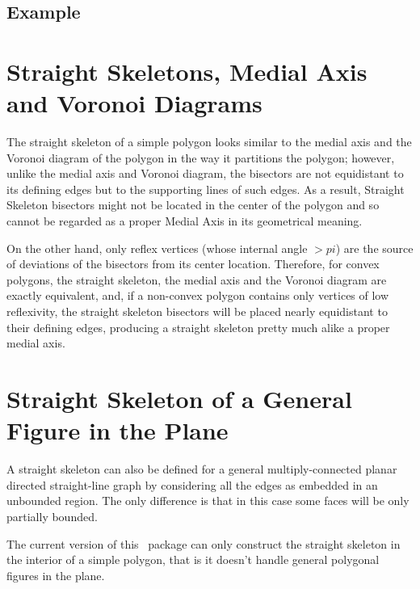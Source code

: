 \subsection{Example}


\section{Straight Skeletons, Medial Axis and Voronoi Diagrams}  

The straight skeleton of a simple polygon looks similar to the medial
axis and the Voronoi diagram of the polygon in the way it partitions
the polygon; however, unlike the medial axis and Voronoi diagram, the
bisectors are not equidistant to its defining edges but to the
supporting lines of such edges. As a result, Straight Skeleton
bisectors might not be located in the center of the polygon and so
cannot be regarded as a proper Medial Axis in its geometrical meaning.

On the other hand, only reflex vertices (whose internal angle $>pi$)
are the source of deviations of the bisectors from its center
location. Therefore, for convex polygons, the straight skeleton, the
medial axis and the Voronoi diagram are exactly equivalent,
and, if a non-convex polygon contains only vertices of low
reflexivity, the straight skeleton bisectors will be placed nearly
equidistant to their defining edges, producing a straight skeleton
pretty much alike a proper medial axis.


\section{Straight Skeleton of a General Figure in the Plane}

A straight skeleton can also be defined for a general
multiply-connected planar directed straight-line graph \cite{aa-skfgpf-95} by considering
all the edges as embedded in an unbounded region. The only difference
is that in this case some faces will be only partially bounded.


The current version of this \cgal\ package can only construct the
straight skeleton in the interior of a simple polygon, that is it
doesn't handle general polygonal figures in the plane.


